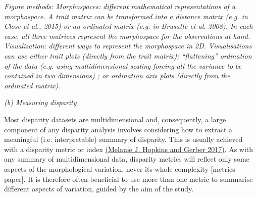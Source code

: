 \documentclass[12pt,letterpaper]{article}
\renewcommand{\subsection}[1]{%
\bigskip
\begin{center}
\begin{large}
\normalfont\itshape #1
\end{large}
\end{center}}
\begin{document}
\emph{Figure methods: Morphospaces: different mathematical representations of a} \emph{morphospace.
A trait matrix can be transformed into a distance matrix (e.g. in Close et al., 2015) or an ordinated matrix (e.g. in Brusatte et al.} \emph{2008).
In each case, all three matrices represent the morphospace for the observations at hand.
Visualisation: different ways to represent the morphospace in 2D.
Visualisations can use either trait plots (directly from the trait matrix); ``flattening'' ordination of the data (e.g. using multidimensional scaling} \emph{forcing all the variance to be contained in two dimensions)
; or ordination axis plots (directly from the ordinated matrix).}

\hypertarget{b-disparity-indices}{%
\subsection{(b) Measuring disparity}\label{c-disparity-indices}}

Most disparity datasets are multidimensional and, consequently, a large component of any disparity analysis involves considering how to extract a meaningful (i.e. interpretable) summary of disparity.
This is usually achieved with a disparity metric or index \href{https://paperpile.com/c/sTGYvp/vTHS}{(Melanie J. Hopkins and Gerber 2017)}.
As with any summary of multidimensional data, disparity metrics will reflect only some aspects of the morphological variation, never its whole complexity {[}metrics paper{]}.
It is therefore often beneficial to use more than one metric to summarise different aspects of variation, guided by the aim of the study.
\end{document}
